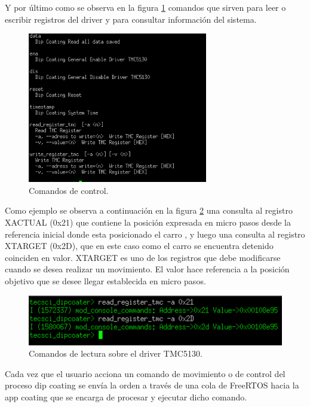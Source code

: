 Y por último como se observa en la figura \ref{fig:consola_comandos} comandos que sirven para leer o escribir registros del driver y para consultar información del sistema.
\begin{figure}[h!]
	\centering
	\includegraphics[width=0.7\textwidth]{./Figures/consola_3.png}
	\caption{Comandos de control.}
	\label{fig:consola_comandos}
\end{figure}

Como ejemplo se observa a continuación en la figura \ref{fig:comando_lectura} una consulta al registro XACTUAL (0x21) que contiene la posición expresada en micro pasos desde la referencia inicial donde esta posicionado el carro , y luego una consulta al registro XTARGET (0x2D), que en este caso como el carro se encuentra detenido coinciden en valor. XTARGET es uno de los registros que debe modificarse cuando se desea realizar un movimiento. El valor hace referencia a la posición objetivo que se desee llegar establecida en micro pasos.

\begin{figure}[h!]
	\centering
	\includegraphics[width=1\textwidth]{./Figures/consola_6.png}
	\caption{Comandos de lectura sobre el driver TMC5130.}
	\label{fig:comando_lectura}
\end{figure}


Cada vez que el usuario acciona un comando de movimiento o de control del proceso dip coating se envía la orden a través de una cola de FreeRTOS hacia la app coating que se encarga de procesar y ejecutar dicho comando.

